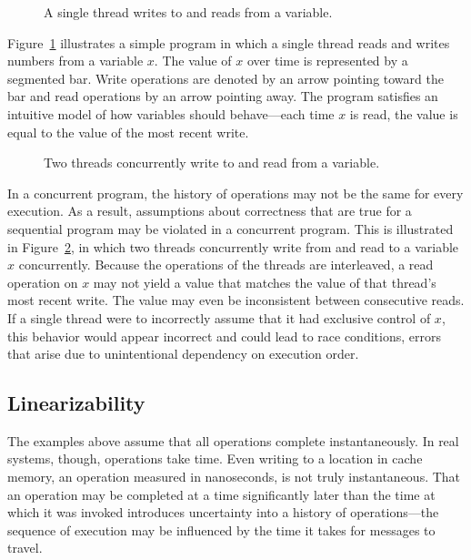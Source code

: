\documentclass{sig-alternate}
\begin{document}
\begin{figure}[h]
  \centering
  \resizebox{\linewidth}{!}{}
  \caption{A single thread writes to and reads from a variable.}
\label{figure:single}
\end{figure}

Figure~\ref{figure:single} illustrates a simple program in which a single thread reads and writes numbers from a variable $x$. The value of $x$ over time is represented by a segmented bar. Write operations are denoted by an arrow pointing toward the bar and read operations by an arrow pointing away. The program satisfies an intuitive model of how variables should behave---each time $x$ is read, the value is equal to the value of the most recent write.

\begin{figure}[h]
  \centering
  \resizebox{\linewidth}{!}{}
  \caption{Two threads concurrently write to and read from a variable.}
\label{figure:multiple}
\end{figure}

In a concurrent program, the history of operations may not be the same for every execution. As a result, assumptions about correctness that are true for a sequential program may be violated in a concurrent program. This is illustrated in Figure~\ref{figure:multiple}, in which two threads concurrently write from and read to a variable $x$ concurrently. Because the operations of the threads are interleaved, a read operation on $x$ may not yield a value that matches the value of that thread's most recent write. The value may even be inconsistent between consecutive reads. If a single thread were to incorrectly assume that it had exclusive control of $x$, this behavior would appear incorrect and could lead to race conditions, errors that arise due to unintentional dependency on execution order.

\subsection{Linearizability}

The examples above assume that all operations complete instantaneously. In real systems, though, operations take time. Even writing to a location in cache memory, an operation measured in nanoseconds, is not truly instantaneous. That an operation may be completed at a time significantly later than the time at which it was invoked introduces uncertainty into a history of operations---the sequence of execution may be influenced by the time it takes for messages to travel.
\end{document}
